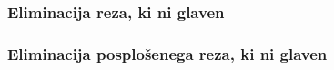 \subsubsection{Eliminacija reza, ki ni glaven}


\subsubsection{Eliminacija posplošenega reza, ki ni glaven}


%
%

